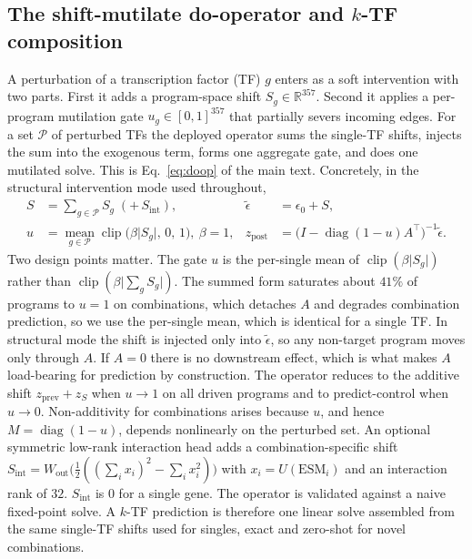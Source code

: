 \subsection{The shift-mutilate do-operator and $k$-TF composition}
A perturbation of a transcription factor (TF) $g$ enters as a soft intervention with two
parts. First it adds a program-space shift $S_g\in\mathbb{R}^{357}$. Second it applies a
per-program mutilation gate $u_g\in[0,1]^{357}$ that partially severs incoming edges. For
a set $\mathcal{P}$ of perturbed TFs the deployed operator sums the single-TF shifts,
injects the sum into the exogenous term, forms one aggregate gate, and does one mutilated
solve. This is Eq.~\eqref{eq:doop} of the main text. Concretely, in the structural
intervention mode used throughout,
\begin{align}
S &= \textstyle\sum_{g\in\mathcal{P}} S_g \;(+\,S_{\mathrm{int}}), &
\tilde{\epsilon} &= \epsilon_0 + S, \label{eq:doop_struct}\\
u &= \operatorname*{mean}_{g\in\mathcal{P}} \operatorname{clip}\!\big(\beta\lvert S_g\rvert,\,0,\,1\big),\ \beta{=}1, &
z_{\mathrm{post}} &= \big(I-\operatorname{diag}(1-u)A^{\top}\big)^{-1}\tilde{\epsilon}. \nonumber
\end{align}
Two design points matter. The gate $u$ is the per-single mean of $\operatorname{clip}(\beta\lvert S_g\rvert)$
rather than $\operatorname{clip}(\beta\lvert\sum_g S_g\rvert)$. The summed form saturates
about $41\%$ of programs to $u{=}1$ on combinations, which detaches $A$ and degrades
combination prediction, so we use the per-single mean, which is identical for a single TF.
In structural mode the shift is injected only into
$\tilde{\epsilon}$, so any non-target program moves only through $A$. If $A{=}0$ there is
no downstream effect, which is what makes $A$ load-bearing for prediction by construction.
The operator reduces to the additive shift $z_{\mathrm{prev}}+z_S$
when $u\to1$ on all driven programs and to predict-control when $u\to0$. Non-additivity
for combinations arises because $u$, and hence $M=\operatorname{diag}(1-u)$, depends
nonlinearly on the perturbed set. An optional symmetric low-rank interaction head adds a
combination-specific shift $S_{\mathrm{int}}=W_{\mathrm{out}}\big(\tfrac12((\sum_i x_i)^2-\sum_i x_i^2)\big)$
with $x_i=U(\text{ESM}_i)$ and an interaction rank of $32$. $S_{\mathrm{int}}$ is $0$ for a
single gene. The operator is validated against a naive fixed-point solve. A $k$-TF
prediction is therefore one linear solve assembled from
the same single-TF shifts used for singles, exact and zero-shot for novel combinations.

